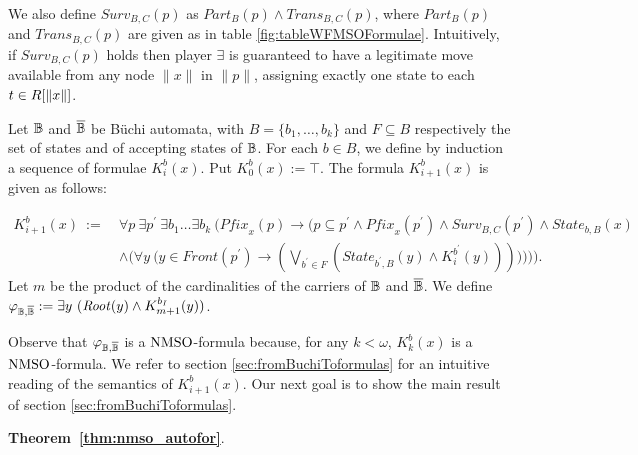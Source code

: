 \begin{definition}
We also define $\mathit{Surv}_{B,C}(p)$ as $\mathit{Part}_B(p) \wedge \mathit{Trans}_{B,C}(p)$, where $\mathit{Part}_B(p)$ and $\mathit{Trans}_{B,C}(p)$ are given as in table \ref{fig:tableWFMSOFormulae}. Intuitively, if $\mathit{Surv}_{B,C}(p)$ holds then player $\exists$ is guaranteed to have a legitimate move available from any node $\|x\|$ in $\|p\|$, assigning exactly one state to each $t \in R[\|x\|]$.
\end{definition}


\begin{definition}\label{DEF_K_m} Let $\mathbb{B}$ and $\overline{\mathbb{B}}$ be B\"{u}chi automata, with $B = \{b_1,\dots,b_k\}$ and $F\subseteq B$ respectively the set of states and of accepting states of $\mathbb{B}$. For each $b \in B$, we define by induction a sequence of formulae $K_i^b(x)$. Put $K_0^{b}(x) := \top$. The formula $K_{i+1}^{b}(x)$ is given as follows:

\begin{align*}
  K_{i+1}^{b}(x)\ :=\ & \forall p\ \exists p^{\prime}\ \exists b_1\dots\exists b_k\ \Bigg(\mathit{Pfix}_x(p) \rightarrow
                       \bigg(p \subseteq p^{\prime} \wedge \mathit{Pfix}_x(p^{\prime}) \wedge \mathit{Surv}_{B,C}(p^{\prime}) \wedge
                       \mathit{State}_{b,B}(x)  \\
                       & \wedge \Big(\forall y\ \big(y\in \mathit{Front}(p^{\prime})\rightarrow 
                       (\bigvee_{b^{\prime} \in F} (\mathit{State}_{b^{\prime},B}(y) \wedge K_i^{b^{\prime}}(y)))\big)\Big)\bigg)\Bigg).
\end{align*}
Let $m$ be the product of the cardinalities of the carriers of $\mathbb{B}$ and $\overline{\mathbb{B}}$. We define $\varphi_{\baut,\overline{\baut}} \df \exists y\ (\mathit{Root}(y) \wedge K_{m+1}^{b_I}(y))$. \end{definition}

Observe that $\varphi_{\mathbb{B},\overline{\mathbb{B}}}$ is a $\mathrm{NMSO}$-formula because, for any $k < \omega$, $K_k^b(x)$ is a $\mathrm{NMSO}$-formula. We refer to section \ref{sec:fromBuchiToformulas} for an intuitive reading of the semantics of $K_{i+1}^{b}(x)$. Our next goal is to show the main result of section \ref{sec:fromBuchiToformulas}.

\begin{trivlist}
\item \textbf{Theorem~\ref{thm:nmso_autofor}}. \ThWeakAutToWFMSO
\end{trivlist}

